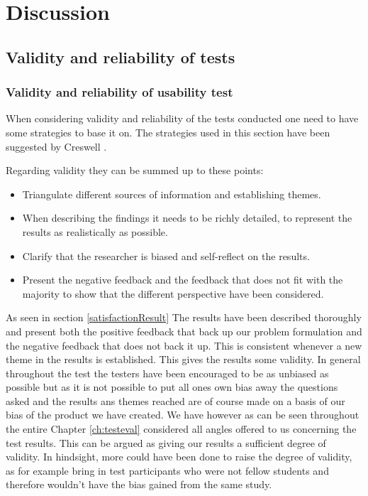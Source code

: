 \chapter{Discussion}\label{ch:discussion}

\section{Validity and reliability of tests}

\subsection{Validity and reliability of usability test}
When considering validity and reliability of the tests conducted one need to have some strategies to base it on. The strategies used in this section have been suggested by Creswell \citep{Creswell}.

Regarding validity they can be summed up to these points:
\begin{itemize}
\item Triangulate different sources of information and establishing themes.
\item When describing the findings it needs to be richly detailed, to represent the results as realistically as possible.
\item Clarify that the researcher is biased and self-reflect on the results.
\item Present the negative feedback and the feedback that does not fit with the majority to show that the different perspective have been considered.
\end{itemize}

As seen in section \ref{satisfactionResult} The results have been described thoroughly and present both the positive feedback that back up our problem formulation and the negative feedback that does not back it up. This is consistent whenever a new theme in the results is established. This gives the results some validity. In general throughout the test the testers have been encouraged to be as unbiased as possible but as it is not possible to put all ones own bias away the questions asked and the results ans themes reached are of course made on a basis of our bias of the product we have created. We have however as can be seen throughout the entire Chapter \ref{ch:testeval} considered all angles offered to us concerning the test results. This can be argued as giving our results a sufficient degree of validity. In hindsight, more could have been done to raise the degree of validity, as for example bring in test participants who were not fellow students and therefore wouldn't have the bias gained from the same study. 


